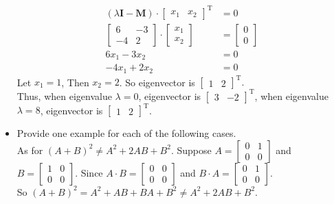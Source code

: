 \documentclass{article}
\begin{document}
\begin{itemize}
\begin{align*}
(\lambda \bm{I} - \bm{M}) \cdot \begin{bmatrix}
			x_{1} & x_{2}
		\end{bmatrix}^\mathrm{T} &= 0\\
		\begin{bmatrix}
			6 & -3 \\
			-4 & 2
		\end{bmatrix} \cdot 
		\begin{bmatrix}
			x_{1} \\
			x_{2}
		\end{bmatrix}&= 
			\begin{bmatrix}
				0 \\ 0
			\end{bmatrix}\\
			6x_{1} - 3x_{2} &= 0\\
			-4x_{1} + 2x_{2} &= 0
\end{align*}
Let $x_{1} = 1$, Then $x_{2} = 2$. So eigenvector is $\begin{bmatrix}
	1 & 2
\end{bmatrix}^{\mathrm{T}}.$\\
Thus, when eigenvalue $\lambda = 0$, eigenvector is $\begin{bmatrix}
	3 & -2
\end{bmatrix}^{\mathrm{T}}$, when eigenvalue $\lambda = 8$, eigenvector is $\begin{bmatrix}
	1 & 2
\end{bmatrix}^{\mathrm{T}}$.\\
\item Provide one example for each of the following cases.\\
As for $(A + B)^2 \not= A^2 + 2AB + B^2$. Suppose $A=\begin{bmatrix}
	0 & 1\\0&0
\end{bmatrix}$ and $B=\begin{bmatrix}
	1 & 0\\0&0
\end{bmatrix}$. Since $A\cdot B = \begin{bmatrix}
	0 & 0\\0&0
\end{bmatrix}$ and $B\cdot A = \begin{bmatrix}
	0 & 1\\0&0
\end{bmatrix}$.\\
So $(A + B)^2 = A ^ 2 + AB + BA + B^2 \not= A^2 + 2AB + B^2.$\\

\end{itemize}
\end{document}
